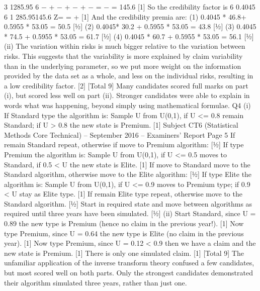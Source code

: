   3
  1285.95
  6
  − + − + − + −
  =
    −
  = 145.6 [1]
  So the credibility factor is 6 0.4045
  6 1 285.95145.6
  Z= =
    +
    [1]
  And the credibility premia are:
    (1) 0.4045 * 46.8+ 0.5955 * 53.05 = 50.5 [½]
  (2) 0.4045* 30.2 + 0.5955 * 53.05 = 43.8 [½]
  (3) 0.4045 * 74.5 + 0.5955 * 53.05 = 61.7 [½]
  (4) 0.4045 * 60.7 + 0.5955 * 53.05 = 56.1 [½]
  (ii) The variation within risks is much bigger relative to the variation between
  risks. This suggests that the variability is more explained by claim variability
  than in the underlying parameter, so we put more weight on the information
  provided by the data set as a whole, and less on the individual risks, resulting
  in a low credibility factor. [2]
  [Total 9]
  Many candidates scored full marks on part (i), but scored less well on part (ii).
  Stronger candidates were able to explain in words what was happening,
  beyond simply using mathematical formulae.
  Q4 (i) If Standard type the algorithm is:
    Sample U from U(0,1), if U <= 0.8 remain Standard; if U > 0.8 the new state
  is Premium. [1]
  Subject CT6 (Statistical Methods Core Technical) – September 2016 – Examiners’ Report
  Page 5
  If remain Standard repeat, otherwise if move to Premium algorithm: [½]
  If type Premium the algorithm is:
    Sample U from U(0,1), if U <= 0.5 moves to Standard, if 0.5 < U the new state
  is Elite. [1]
  If move to Standard move to the Standard algorithm, otherwise move to the
  Elite algorithm: [½]
  If type Elite the algorithm is:
    Sample U from U(0,1), if U <= 0.9 moves to Premium type; if 0.9 < U stay as
  Elite type. [1]
  If remain Elite type repeat, otherwise move to the Standard algorithm. [½]
  Start in required state and move between algorithms as required until three
  years have been simulated. [½]
  (ii) Start Standard, since U = 0.89 the new type is Premium (hence no claim in the
                                                               previous year!). [1]
  Now type Premium, since U = 0.64 the new type is Elite (no claim in the
                                                          previous year). [1]
  Now type Premium, since U = 0.12 < 0.9 then we have a claim and the new
  state is Premium. [1]
  There is only one simulated claim. [1]
  [Total 9]
  The unfamiliar application of the inverse transform theory confused a few
  candidates, but most scored well on both parts. Only the strongest
  candidates demonstrated their algorithm simulated three years, rather than
  just one.
  
